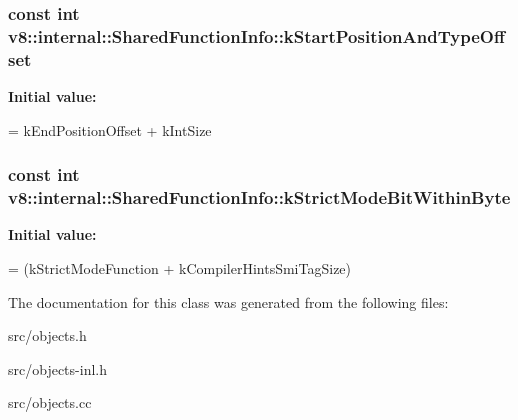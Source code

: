 \subsubsection[{k\+Start\+Position\+And\+Type\+Offset}]{\setlength{\rightskip}{0pt plus 5cm}const int v8\+::internal\+::\+Shared\+Function\+Info\+::k\+Start\+Position\+And\+Type\+Offset\hspace{0.3cm}{\ttfamily [static]}}\label{classv8_1_1internal_1_1_shared_function_info_a9a9b07c0031b3347474e51812a8b9f76}
{\bfseries Initial value\+:}
\begin{DoxyCode}
=
      kEndPositionOffset + kIntSize
\end{DoxyCode}
\hypertarget{classv8_1_1internal_1_1_shared_function_info_a8c71a51bde843b01efc2c2320ef0ab4e}{}
\subsubsection[{k\+Strict\+Mode\+Bit\+Within\+Byte}]{\setlength{\rightskip}{0pt plus 5cm}const int v8\+::internal\+::\+Shared\+Function\+Info\+::k\+Strict\+Mode\+Bit\+Within\+Byte\hspace{0.3cm}{\ttfamily [static]}}\label{classv8_1_1internal_1_1_shared_function_info_a8c71a51bde843b01efc2c2320ef0ab4e}
{\bfseries Initial value\+:}
\begin{DoxyCode}
=
      (kStrictModeFunction + kCompilerHintsSmiTagSize) %
\end{DoxyCode}


The documentation for this class was generated from the following files\+:\begin{DoxyCompactItemize}
\item 
src/objects.\+h\item 
src/objects-\/inl.\+h\item 
src/objects.\+cc\end{DoxyCompactItemize}
